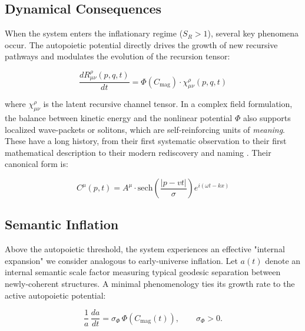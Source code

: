 \subsection{Dynamical Consequences}
\label{7.3.1:dynamical_consequences}

When the system enters the inflationary regime (\(S_R > 1\)), several key phenomena occur. The autopoietic potential directly drives the growth of new recursive pathways and modulates the evolution of the recursion tensor:

\begin{equation}
\frac{dR^\rho_{\mu\nu}(p,q,t)}{dt} = \Phi(C_{\mathrm{mag}}) \cdot \chi^\rho_{\mu\nu}(p,q,t)
\end{equation}

where \(\chi^\rho_{\mu\nu}\) is the latent recursive channel tensor. In a complex field formulation, the balance between kinetic energy and the nonlinear potential \(\Phi\) also supports localized wave-packets or solitons, which are self-reinforcing units of \textit{meaning}. These have a long history, from their first systematic observation \autocite{Russell1845} to their first mathematical description \autocite{KortewegdeVries1895} to their modern rediscovery and naming \autocite{ZabuskyKruskal1965}. Their canonical form is:

\begin{equation}
C^\mu(p,t) = A^\mu \cdot \text{sech}\left(\frac{|p-vt|}{\sigma}\right) e^{i(\omega t - kx)}
\end{equation}


\subsection{Semantic Inflation}
\label{7.3.2:semantic_inflation}

Above the autopoietic threshold, the system experiences an effective "internal expansion" we consider analogous to early-universe inflation. Let \(a(t)\) denote an internal semantic scale factor measuring typical geodesic separation between newly-coherent structures. A minimal phenomenology ties its growth rate to the active autopoietic potential:

\begin{equation}
\frac{1}{a}\,\frac{da}{dt} = \sigma_\Phi\, \Phi(C_{\mathrm{mag}}(t)), \qquad \sigma_\Phi>0.
\end{equation}

